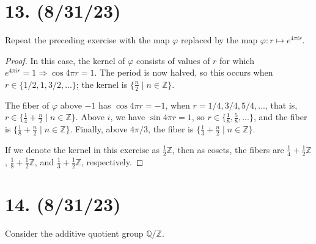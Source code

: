 \documentclass{article}
\begin{document}
\section*{13. (8/31/23)}

Repeat the preceding exercise with the map $\varphi$ replaced by the map $\varphi: r \mapsto e^{4 \pi i r}$.

\begin{proof}
    In this case, the kernel of $\varphi$ consists of values of $r$ for which $e^{4 \pi i r} = 1 \Rightarrow \cos{4 \pi r} = 1$. The period is now halved, so this occurs when $r \in \{ 1/2, 1, 3/2, ... \}$; the kernel is $\{ \frac{n}{2} \mid n \in \mathbb{Z} \}$.

    The fiber of $\varphi$ above $-1$ has $\cos{4 \pi r} = -1$, when $r = 1/4, 3/4, 5/4, ...$, that is, $r \in \{ \frac{1}{4} + \frac{n}{2} \mid n \in \mathbb{Z} \}$. Above $i$, we have $\sin{4 \pi r} = 1$, so $r \in \{ \frac{1}{8}, \frac{5}{8}, ... \}$, and the fiber is $\{ \frac{1}{8} + \frac{n}{2} \mid n \in \mathbb{Z} \}$. Finally, above $4 \pi / 3$, the fiber is $\{ \frac{1}{3} + \frac{n}{2} \mid n \in \mathbb{Z} \}$.

    If we denote the kernel in this exercise as $\frac{1}{2}\mathbb{Z}$, then as cosets, the fibers are $\frac{1}{4} + \frac{1}{2}\mathbb{Z}$, $\frac{1}{8} + \frac{1}{2}\mathbb{Z}$, and $\frac{1}{3} + \frac{1}{2}\mathbb{Z}$, respectively.
\end{proof}

\section*{14. (8/31/23)}

Consider the additive quotient group $\mathbb{Q}/\mathbb{Z}$.
\end{document}
